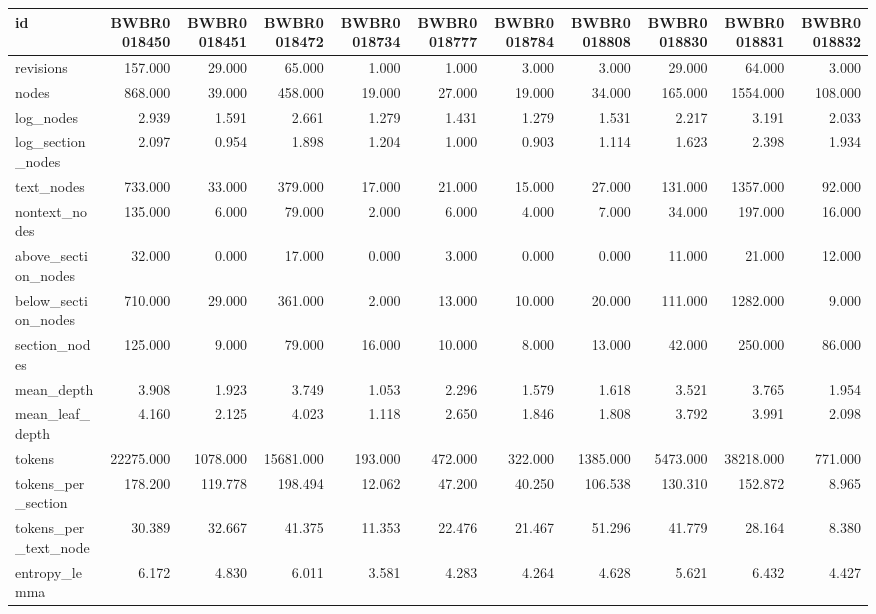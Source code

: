 \begin{tabular}{lrrrrrrrrrr}
\toprule
id & BWBR0018450 & BWBR0018451 & BWBR0018472 & BWBR0018734 & BWBR0018777 & BWBR0018784 & BWBR0018808 & BWBR0018830 & BWBR0018831 & BWBR0018832 \\
\midrule
revisions & 157.000 & 29.000 & 65.000 & 1.000 & 1.000 & 3.000 & 3.000 & 29.000 & 64.000 & 3.000 \\
\cline{1-11}
nodes & 868.000 & 39.000 & 458.000 & 19.000 & 27.000 & 19.000 & 34.000 & 165.000 & 1554.000 & 108.000 \\
\cline{1-11}
log\_nodes & 2.939 & 1.591 & 2.661 & 1.279 & 1.431 & 1.279 & 1.531 & 2.217 & 3.191 & 2.033 \\
\cline{1-11}
log\_section\_nodes & 2.097 & 0.954 & 1.898 & 1.204 & 1.000 & 0.903 & 1.114 & 1.623 & 2.398 & 1.934 \\
\cline{1-11}
text\_nodes & 733.000 & 33.000 & 379.000 & 17.000 & 21.000 & 15.000 & 27.000 & 131.000 & 1357.000 & 92.000 \\
\cline{1-11}
nontext\_nodes & 135.000 & 6.000 & 79.000 & 2.000 & 6.000 & 4.000 & 7.000 & 34.000 & 197.000 & 16.000 \\
\cline{1-11}
above\_section\_nodes & 32.000 & 0.000 & 17.000 & 0.000 & 3.000 & 0.000 & 0.000 & 11.000 & 21.000 & 12.000 \\
\cline{1-11}
below\_section\_nodes & 710.000 & 29.000 & 361.000 & 2.000 & 13.000 & 10.000 & 20.000 & 111.000 & 1282.000 & 9.000 \\
\cline{1-11}
section\_nodes & 125.000 & 9.000 & 79.000 & 16.000 & 10.000 & 8.000 & 13.000 & 42.000 & 250.000 & 86.000 \\
\cline{1-11}
mean\_depth & 3.908 & 1.923 & 3.749 & 1.053 & 2.296 & 1.579 & 1.618 & 3.521 & 3.765 & 1.954 \\
\cline{1-11}
mean\_leaf\_depth & 4.160 & 2.125 & 4.023 & 1.118 & 2.650 & 1.846 & 1.808 & 3.792 & 3.991 & 2.098 \\
\cline{1-11}
tokens & 22275.000 & 1078.000 & 15681.000 & 193.000 & 472.000 & 322.000 & 1385.000 & 5473.000 & 38218.000 & 771.000 \\
\cline{1-11}
tokens\_per\_section & 178.200 & 119.778 & 198.494 & 12.062 & 47.200 & 40.250 & 106.538 & 130.310 & 152.872 & 8.965 \\
\cline{1-11}
tokens\_per\_text\_node & 30.389 & 32.667 & 41.375 & 11.353 & 22.476 & 21.467 & 51.296 & 41.779 & 28.164 & 8.380 \\
\cline{1-11}
entropy\_lemma & 6.172 & 4.830 & 6.011 & 3.581 & 4.283 & 4.264 & 4.628 & 5.621 & 6.432 & 4.427 \\

\end{tabular}
